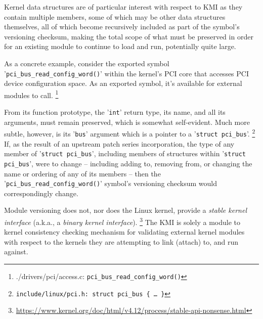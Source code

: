 \documentclass[10pt,oneside,english]{book}
\begin{document}
Kernel data structures are of particular interest with respect to
KMI as they contain multiple members, some of which may be other data
structures themselves, all of which become recursively included as
part of the symbol's versioning checksum, making the total scope of
what must be preserved in order for an existing module to continue
to load and run, potentially quite large.

As a concrete example, consider the exported symbol '\texttt{pci\_bus\_read\_config\_word()}'
within the kernel's PCI core that accesses PCI device configuration
space. As an exported symbol, it's available for external modules
to call. \footnote{./drivers/pci/access.c: \texttt{pci\_bus\_read\_config\_word()}}


From its function prototype, the '\texttt{int}' return type, its name,
and all its arguments, must remain preserved, which is somewhat self-evident.
Much more subtle, however, is its '\texttt{bus}' argument which is
a pointer to a '\texttt{struct pci\_bus}'. \footnote{\texttt{\label{fn:c1f6}include/linux/pci.h: struct pci\_bus \{ …
\}}} If, as the result of an upstream patch series incorporation, the
type of any member of '\texttt{struct pci\_bus}', including members
of structures within '\texttt{struct pci\_bus}', were to change --
including adding to, removing from, or changing the name or ordering
of any of its members -- then the '\texttt{pci\_bus\_read\_config\_word()}'
symbol's versioning checksum would correspondingly change.

Module versioning does not, nor does the Linux kernel, provide a \emph{stable
kernel interface} (a.k.a., a \emph{binary kernel interface}). \footnote{\href{https://www.kernel.org/doc/html/v4.12/process/stable-api-nonsense.html}{https://www.kernel.org/doc/html/v4.12/process/stable-api-nonsense.html}}
The KMI is solely a module to kernel consistency checking mechanism
for validating external kernel modules with respect to the kernels
they are attempting to link (attach) to, and run against.
\end{document}
